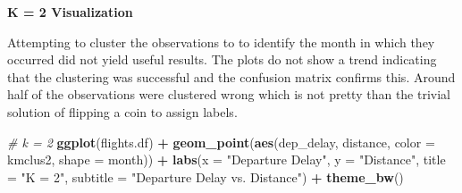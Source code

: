 \documentclass[
]{article}
\newenvironment{Shaded}{\begin{snugshade}}{\end{snugshade}}
\newcommand{\AttributeTok}[1]{\textcolor[rgb]{0.13,0.29,0.53}{#1}}
\newcommand{\CommentTok}[1]{\textcolor[rgb]{0.56,0.35,0.01}{\textit{#1}}}
\newcommand{\DecValTok}[1]{\textcolor[rgb]{0.00,0.00,0.81}{#1}}
\newcommand{\FloatTok}[1]{\textcolor[rgb]{0.00,0.00,0.81}{#1}}
\newcommand{\FunctionTok}[1]{\textcolor[rgb]{0.13,0.29,0.53}{\textbf{#1}}}
\newcommand{\NormalTok}[1]{#1}
\newcommand{\OtherTok}[1]{\textcolor[rgb]{0.56,0.35,0.01}{#1}}
\newcommand{\SpecialCharTok}[1]{\textcolor[rgb]{0.81,0.36,0.00}{\textbf{#1}}}
\newcommand{\StringTok}[1]{\textcolor[rgb]{0.31,0.60,0.02}{#1}}
\begin{document}
\begin{Shaded}
\end{Shaded}

\textbf{K = 2 Visualization}

Attempting to cluster the observations to to identify the month in which
they occurred did not yield useful results. The plots do not show a
trend indicating that the clustering was successful and the confusion
matrix confirms this. Around half of the observations were clustered
wrong which is not pretty than the trivial solution of flipping a coin
to assign labels.

\begin{Shaded}
\begin{Highlighting}[]
\CommentTok{\# k = 2}
\FunctionTok{ggplot}\NormalTok{(flights.df) }\SpecialCharTok{+} \FunctionTok{geom\_point}\NormalTok{(}\FunctionTok{aes}\NormalTok{(dep\_delay, distance, }\AttributeTok{color =}\NormalTok{ kmclus2,}
    \AttributeTok{shape =}\NormalTok{ month)) }\SpecialCharTok{+} \FunctionTok{labs}\NormalTok{(}\AttributeTok{x =} \StringTok{"Departure Delay"}\NormalTok{, }\AttributeTok{y =} \StringTok{"Distance"}\NormalTok{,}
    \AttributeTok{title =} \StringTok{"K = 2"}\NormalTok{, }\AttributeTok{subtitle =} \StringTok{"Departure Delay vs. Distance"}\NormalTok{) }\SpecialCharTok{+}
    \FunctionTok{theme\_bw}\NormalTok{()}
\end{Highlighting}
\end{Shaded}
\end{document}
